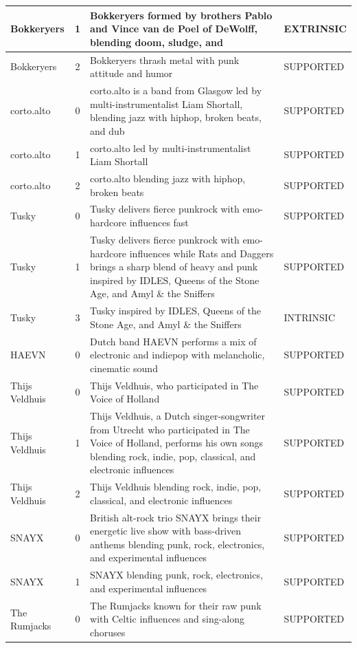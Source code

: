 \begin{center}
\begin{longtable}{p{3cm}cp{7cm}p{3cm}}
\midrule
Bokkeryers & 1 & Bokkeryers formed by brothers Pablo and Vince van de Poel of DeWolff, blending doom, sludge, and & EXTRINSIC \\
\midrule
Bokkeryers & 2 & Bokkeryers thrash metal with punk attitude and humor & SUPPORTED \\
\midrule
corto.alto & 0 & corto.alto is a band from Glasgow led by multi-instrumentalist Liam Shortall, blending jazz with hiphop, broken beats, and dub & SUPPORTED \\
\midrule
corto.alto & 1 & corto.alto led by multi-instrumentalist Liam Shortall & SUPPORTED \\
\midrule
corto.alto & 2 & corto.alto blending jazz with hiphop, broken beats & SUPPORTED \\
\midrule
Tusky & 0 & Tusky delivers fierce punkrock with emo-hardcore influences fast & SUPPORTED \\
\midrule
Tusky & 1 & Tusky delivers fierce punkrock with emo-hardcore influences while Rats and Daggers brings a sharp blend of heavy and punk inspired by IDLES, Queens of the Stone Age, and Amyl \& the Sniffers & SUPPORTED \\
\midrule
Tusky & 3 & Tusky inspired by IDLES, Queens of the Stone Age, and Amyl \& the Sniffers & INTRINSIC \\
\midrule
HAEVN & 0 & Dutch band HAEVN performs a mix of electronic and indiepop with melancholic, cinematic sound & SUPPORTED \\
\midrule
Thijs Veldhuis & 0 & Thijs Veldhuis, who participated in The Voice of Holland & SUPPORTED \\
\midrule
Thijs Veldhuis & 1 & Thijs Veldhuis, a Dutch singer-songwriter from Utrecht who participated in The Voice of Holland, performs his own songs blending rock, indie, pop, classical, and electronic influences & SUPPORTED \\
\midrule
Thijs Veldhuis & 2 & Thijs Veldhuis blending rock, indie, pop, classical, and electronic influences & SUPPORTED \\
\midrule
SNAYX & 0 & British alt-rock trio SNAYX brings their energetic live show with bass-driven anthems blending punk, rock, electronics, and experimental influences & SUPPORTED \\
\midrule
SNAYX & 1 & SNAYX blending punk, rock, electronics, and experimental influences & SUPPORTED \\
\midrule
The Rumjacks & 0 & The Rumjacks known for their raw punk with Celtic influences and sing-along choruses & SUPPORTED \\

\end{longtable}
\end{center}
